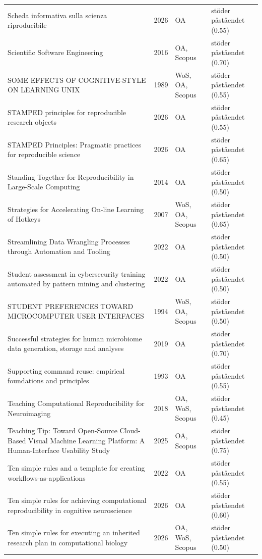 \begin{longtable}{@{}%
  >{\raggedright\arraybackslash}p{}c%
  >{\raggedright\arraybackslash}p{}%
  >{\raggedright\arraybackslash}p{}@{}}
Scheda informativa sulla scienza riproducibile & 2026 & OA & stöder påståendet (0.55) \\
Scientific Software Engineering & 2016 & OA, Scopus & stöder påståendet (0.70) \\
SOME EFFECTS OF COGNITIVE-STYLE ON LEARNING UNIX & 1989 & WoS, OA, Scopus & stöder påståendet (0.55) \\
STAMPED principles for reproducible research objects & 2026 & OA & stöder påståendet (0.55) \\
STAMPED Principles: Pragmatic practices for reproducible science & 2026 & OA & stöder påståendet (0.65) \\
Standing Together for Reproducibility in Large-Scale Computing & 2014 & OA & stöder påståendet (0.50) \\
Strategies for Accelerating On-line Learning of Hotkeys & 2007 & WoS, OA, Scopus & stöder påståendet (0.65) \\
Streamlining Data Wrangling Processes through Automation and Tooling & 2022 & OA & stöder påståendet (0.50) \\
Student assessment in cybersecurity training automated by pattern mining and clustering & 2022 & OA & stöder påståendet (0.50) \\
STUDENT PREFERENCES TOWARD MICROCOMPUTER USER INTERFACES & 1994 & WoS, OA, Scopus & stöder påståendet (0.50) \\
Successful strategies for human microbiome data generation, storage and analyses & 2019 & OA & stöder påståendet (0.70) \\
Supporting command reuse: empirical foundations and principles & 1993 & OA & stöder påståendet (0.55) \\
Teaching Computational Reproducibility for Neuroimaging & 2018 & OA, WoS, Scopus & stöder påståendet (0.45) \\
Teaching Tip: Toward Open-Source Cloud-Based Visual Machine Learning Platform: A Human-Interface Usability Study & 2025 & OA, Scopus & stöder påståendet (0.75) \\
Ten simple rules and a template for creating workflows-as-applications & 2022 & OA & stöder påståendet (0.55) \\
Ten simple rules for achieving computational reproducibility in cognitive neuroscience & 2026 & OA & stöder påståendet (0.60) \\
Ten simple rules for executing an inherited research plan in computational biology & 2026 & OA, WoS, Scopus & stöder påståendet (0.50) \\

\end{longtable}
